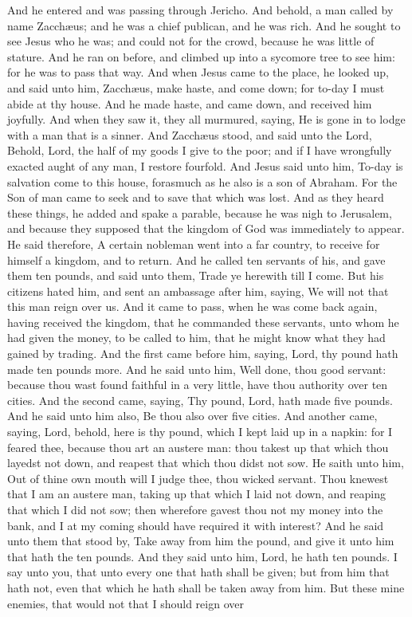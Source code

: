 And he entered and was passing through Jericho. And behold, a man called by name Zacchæus; and he was a chief publican, and he was rich. And he sought to see Jesus who he was; and could not for the crowd, because he was little of stature. And he ran on before, and climbed up into a sycomore tree to see him: for he was to pass that way. And when Jesus came to the place, he looked up, and said unto him, Zacchæus, make haste, and come down; for to-day I must abide at thy house. And he made haste, and came down, and received him joyfully. And when they saw it, they all murmured, saying, He is gone in to lodge with a man that is a sinner. And Zacchæus stood, and said unto the Lord, Behold, Lord, the half of my goods I give to the poor; and if I have wrongfully exacted aught of any man, I restore fourfold. And Jesus said unto him, To-day is salvation come to this house, forasmuch as he also is a son of Abraham. For the Son of man came to seek and to save that which was lost.  And as they heard these things, he added and spake a parable, because he was nigh to Jerusalem, and because they supposed that the kingdom of God was immediately to appear. He said therefore, A certain nobleman went into a far country, to receive for himself a kingdom, and to return. And he called ten servants of his, and gave them ten pounds, and said unto them, Trade ye herewith till I come. But his citizens hated him, and sent an ambassage after him, saying, We will not that this man reign over us. And it came to pass, when he was come back again, having received the kingdom, that he commanded these servants, unto whom he had given the money, to be called to him, that he might know what they had gained by trading. And the first came before him, saying, Lord, thy pound hath made ten pounds more. And he said unto him, Well done, thou good servant: because thou wast found faithful in a very little, have thou authority over ten cities. And the second came, saying, Thy pound, Lord, hath made five pounds. And he said unto him also, Be thou also over five cities. And another came, saying, Lord, behold, here is thy pound, which I kept laid up in a napkin: for I feared thee, because thou art an austere man: thou takest up that which thou layedst not down, and reapest that which thou didst not sow. He saith unto him, Out of thine own mouth will I judge thee, thou wicked servant. Thou knewest that I am an austere man, taking up that which I laid not down, and reaping that which I did not sow; then wherefore gavest thou not my money into the bank, and I at my coming should have required it with interest? And he said unto them that stood by, Take away from him the pound, and give it unto him that hath the ten pounds. And they said unto him, Lord, he hath ten pounds. I say unto you, that unto every one that hath shall be given; but from him that hath not, even that which he hath shall be taken away from him. But these mine enemies, that would not that I should reign over 